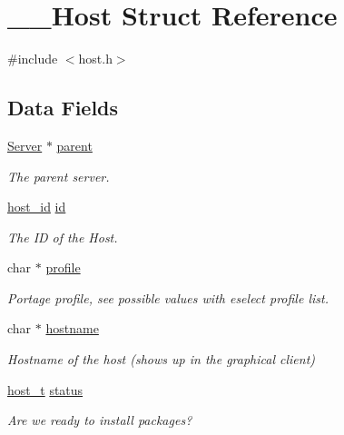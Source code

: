 \hypertarget{struct_____host}{}\section{\+\_\+\+\_\+\+Host Struct Reference}
\label{struct_____host}


{\ttfamily \#include $<$host.\+h$>$}

\subsection*{Data Fields}
\begin{DoxyCompactItemize}
\item 
\mbox{\hyperlink{server_8h_a705d964b8a67edeeb3943273a397e4c2}{Server}} $\ast$ \mbox{\hyperlink{struct_____host_ac050615c8d9d8da7d2cfaffaafd9473d}{parent}}
\begin{DoxyCompactList}\small\item\em The parent server. \end{DoxyCompactList}\item 
\mbox{\hyperlink{host_8h_ad9a5413d8b4376a70706368c97972c2b}{host\+\_\+id}} \mbox{\hyperlink{struct_____host_a2101a62a3859aa1106a2722c659f93c6}{id}}
\begin{DoxyCompactList}\small\item\em The ID of the Host. \end{DoxyCompactList}\item 
char $\ast$ \mbox{\hyperlink{struct_____host_abfbef38d66410fc8705ea35967e65115}{profile}}
\begin{DoxyCompactList}\small\item\em Portage profile, see possible values with eselect profile list. \end{DoxyCompactList}\item 
char $\ast$ \mbox{\hyperlink{struct_____host_a3fdd5a6a4e8dc35d72067996674c9ac5}{hostname}}
\begin{DoxyCompactList}\small\item\em Hostname of the host (shows up in the graphical client) \end{DoxyCompactList}\item 
\mbox{\hyperlink{host_8h_a1392734739c1e1eba62ebfab3bf7dc92}{host\+\_\+t}} \mbox{\hyperlink{struct_____host_a0a366a15966b166891ba8451009df63d}{status}}
\begin{DoxyCompactList}\small\item\em Are we ready to install packages? \end{DoxyCompactList}\item 

\end{DoxyCompactItemize}
